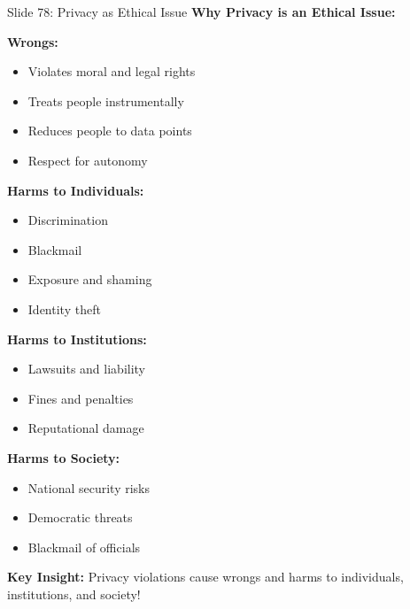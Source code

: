 \documentclass[8pt]{beamer}
\begin{document}
	\begin{frame}{Slide 78: Privacy as Ethical Issue}
		\fontsize{6.5}{7.5}\selectfont
		\textbf{Why Privacy is an Ethical Issue:}
		
		\vspace{0.1cm}
		\textbf{Wrongs:}
		\begin{itemize}
			\item Violates moral and legal rights
			\item Treats people instrumentally
			\item Reduces people to data points
			\item Respect for autonomy
		\end{itemize}
		
		\vspace{0.1cm}
		\textbf{Harms to Individuals:}
		\begin{itemize}
			\item Discrimination
			\item Blackmail
			\item Exposure and shaming
			\item Identity theft
		\end{itemize}
		
		\vspace{0.1cm}
		\textbf{Harms to Institutions:}
		\begin{itemize}
			\item Lawsuits and liability
			\item Fines and penalties
			\item Reputational damage
		\end{itemize}
		
		\vspace{0.1cm}
		\textbf{Harms to Society:}
		\begin{itemize}
			\item National security risks
			\item Democratic threats
			\item Blackmail of officials
		\end{itemize}
		
		\textcolor{myblue}{\textbf{Key Insight:}} Privacy violations cause \textcolor{myblue}{wrongs and harms} to individuals, institutions, and society!
	\end{frame}
	
\end{document}
